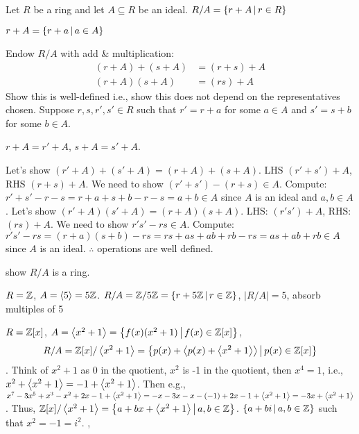 \documentclass[]{article}
\begin{document}
Let $R$ be a ring and let $A\subseteq R$ be an ideal.
$R/A=\left\{ r+A \, \middle| \, r\in R \right\}$
\begin{note}
	$r+A = \left\{ r+a \, \middle| \, a\in A \right\}$
\end{note}
Endow $R/A$ with add \& multiplication:
\begin{align*}
	(r+A)+(s+A) &= (r+s)+A \\
	(r+A)(s+A) &= (rs)+A
\end{align*}
Show this is well-defined i.e., show this does not depend on the representatives chosen.
Suppose $r,s,r',s'\in R$ such that $r'=r+a$ for some $a\in A$ and $s'=s+b$ for some $b\in A$.
\begin{note}
	$r+A=r'+A$, $s+A=s'+A$.
\end{note}
Let's show $(r'+A)+(s'+A)=(r+A)+(s+A)$. LHS $(r'+s')+A$, RHS $(r+s)+A$.
We need to show $(r'+s')-(r+s)\in A$.
Compute: $r'+s'-r-s = r+a + s+b-r-s = a+b\in A$ since $A$ is an ideal and $a,b\in A$.
Let's show $(r'+A)(s'+A) = (r+A)(s+A)$. LHS: $(r's')+A$, RHS: $(rs)+A$.
We need to show $r's'-rs\in A$. Compute:
$r's'-rs = (r+a)(s+b)-rs = rs+as+ab+rb-rs = as+ab+rb\in A$ since $A$ is an ideal.
$\therefore$ operations are well defined.
\begin{xca}
	show $R/A$ is a ring.
\end{xca}
\begin{example}
	$R=\mathbb{Z}$, $A=\left\langle 5 \right\rangle=5\mathbb{Z}$.
	$R/A = \mathbb{Z}/5\mathbb{Z} = \left\{ r+5\mathbb{Z} \, \middle| \, r\in\mathbb{Z} \right\}$, $|R/A|=5$, absorb multiples of 5  
\end{example}
\begin{example}
	$R=\mathbb{Z}[x]$, $A=\left\langle x^2+1 \right\rangle = \left\{ f(x)(x^2+1) \, \middle| \, f(x)\in\mathbb{Z}[x] \right\}$,
	$$R/A = \mathbb{Z}[x]/\left\langle x^2+1 \right\rangle = \left\{ p(x)+\left\langle p(x)+\left\langle x^2+1 \right\rangle \right\rangle \, \middle| \, p(x)\in\mathbb{Z}[x] \right\}$$.
	Think of $x^2+1$ as 0 in the quotient, $x^2$ is -1 in the quotient, then $x^4=1$, i.e., $x^2+\left\langle x^2+1 \right\rangle = -1 + \left\langle x^2+1 \right\rangle$.
	Then  e.g., $x^7-3x^5+x^3-x^2+2x-1+\left\langle x^2+1 \right\rangle = -x-3x-x-(-1)+2x-1+\left\langle x^2+1 \right\rangle = -3x+\left\langle x^2+1 \right\rangle$.
	Thus, $\mathbb{Z}[x]/\left\langle x^2+1 \right\rangle = \left\{ a+bx+\left\langle x^2+1 \right\rangle \, \middle| \, a,b\in\mathbb{Z} \right\}$.
	$\left\{ a+bi \, \middle| \, a,b\in\mathbb{Z} \right\}$ such that $x^2=-1=i^2$.
	, 
\end{example}
\end{document}
